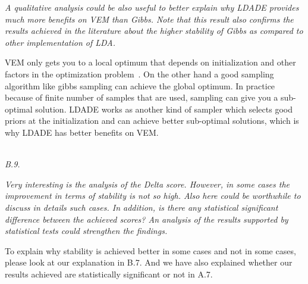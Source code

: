 \documentclass[conference]{IEEEtran}
\begin{document}
\textit{A qualitative analysis could be also useful to better explain why LDADE provides much more benefits on VEM than Gibbs. Note that this result also confirms the results achieved in the literature about the higher stability of Gibbs as compared to other implementation of LDA.\\}

VEM only gets you to a local optimum that depends on initialization and other factors in the optimization problem~\cite{asuncion2009smoothing}. On the other hand a good sampling algorithm like gibbs sampling can achieve the global optimum. In practice because of finite number of samples that are used, sampling can give you a sub-optimal solution. LDADE works as another kind of sampler which selects good priors at the initialization and can achieve better sub-optimal solutions, which is why LDADE has better benefits on VEM.

\noindent
\textit{\\B.9.} 

\textit{Very interesting is the analysis of the Delta score. However, in some cases the improvement in terms of stability is not so high. Also here could be worthwhile to discuss in details such cases. In addition, is there any statistical significant difference between the achieved scores? An analysis of the results supported by statistical tests could strengthen the findings.\\}

To explain why stability is achieved better in some cases and not in some cases, please look at our explanation in B.7. And we have also explained whether our results achieved are statistically significant or not in A.7.


\medskip

\end{document}
